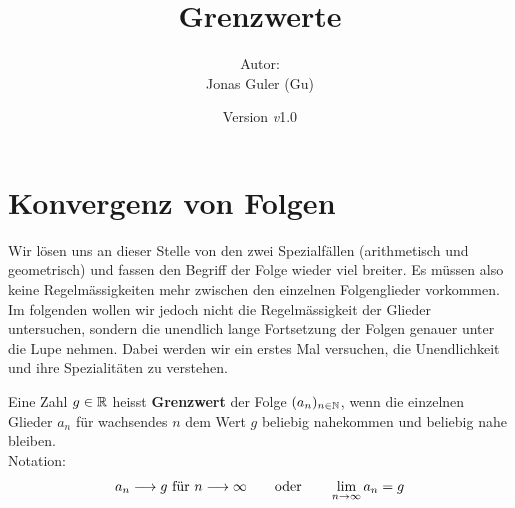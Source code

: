 \documentclass[11pt,oneside]{article}
\newcommand{\Skriptname}{Grenzwerte}
\newcommand{\Autor}{Jonas Guler (Gu)}
\newcommand{\version}{\textit{v}1.0}
\begin{document}
\begin{titlepage}
	\clearpage
	\title{\Huge\textbf{\Skriptname} \\[1cm]}
	\author{Autor:\\ \Autor}
	\date{\normalsize {Version \version}\\ \datelong}
	\maketitle
	\thispagestyle{empty}
	\vfill
	\tableofcontents
\end{titlepage}
\section{Konvergenz von Folgen}
	Wir lösen uns an dieser Stelle von den zwei Spezialfällen (arithmetisch und geometrisch) und fassen den Begriff der Folge wieder viel breiter. Es müssen also keine Regelmässigkeiten mehr zwischen den einzelnen Folgenglieder vorkommen. Im folgenden wollen wir jedoch nicht die Regelmässigkeit der Glieder untersuchen, sondern die unendlich lange Fortsetzung der Folgen genauer unter die Lupe nehmen. Dabei werden wir ein erstes Mal versuchen, die Unendlichkeit und ihre Spezialitäten zu verstehen.
	\begin{definition}
		Eine Zahl $g\in\mathbb{R}$ heisst \textbf{Grenzwert} der Folge $(a_n)_{n\in\mathbb{N}}$, wenn die einzelnen Glieder $a_n$ für wachsendes $n$ dem Wert $g$ beliebig nahekommen und beliebig nahe bleiben.\\
		Notation: \[a_n\longrightarrow g \text{ für } n\longrightarrow\infty \qquad\text{oder}\qquad \lim_{n\rightarrow\infty}a_n=g\]
	\end{definition}
\end{document}
